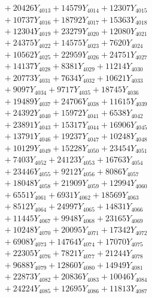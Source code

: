 \documentclass[a4paper,10pt]{article}
\begin{document}
{\begin{align}
&\;  + 20426 Y_{4013} + 14579 Y_{4014} + 12307 Y_{4015} \\[0.3ex]
&\;  + 10737 Y_{4016} + 18792 Y_{4017} + 15363 Y_{4018} \\[0.5ex]\allowbreak
&\;  + 12304 Y_{4019} + 23279 Y_{4020} + 12080 Y_{4021} \\[0.3ex]
&\;  + 24375 Y_{4022} + 14575 Y_{4023} + 7620 Y_{4024} \\[0.3ex]
&\;  + 10562 Y_{4025} + 22959 Y_{4026} + 24751 Y_{4027} \\[0.3ex]
&\;  + 14137 Y_{4028} + 8381 Y_{4029} + 11214 Y_{4030} \\[0.3ex]
&\;  + 20773 Y_{4031} + 7634 Y_{4032} + 10621 Y_{4033} \\[0.3ex]
&\;  + 9097 Y_{4034} + 9717 Y_{4035} + 18745 Y_{4036} \\[0.3ex]
&\;  + 19489 Y_{4037} + 24706 Y_{4038} + 11615 Y_{4039} \\[0.3ex]
&\;  + 24392 Y_{4040} + 15972 Y_{4041} + 6538 Y_{4042} \\[0.3ex]
&\;  + 23891 Y_{4043} + 15317 Y_{4044} + 16906 Y_{4045} \\[0.3ex]
&\;  + 13791 Y_{4046} + 19237 Y_{4047} + 10248 Y_{4048} \\[0.5ex]\allowbreak
&\;  + 10129 Y_{4049} + 15228 Y_{4050} + 23454 Y_{4051} \\[0.3ex]
&\;  + 7403 Y_{4052} + 24123 Y_{4053} + 16763 Y_{4054} \\[0.3ex]
&\;  + 23446 Y_{4055} + 9212 Y_{4056} + 8086 Y_{4057} \\[0.3ex]
&\;  + 18048 Y_{4058} + 21909 Y_{4059} + 12994 Y_{4060} \\[0.3ex]
&\;  + 6551 Y_{4061} + 6931 Y_{4062} + 18569 Y_{4063} \\[0.3ex]
&\;  + 8512 Y_{4064} + 24997 Y_{4065} + 14831 Y_{4066} \\[0.3ex]
&\;  + 11445 Y_{4067} + 9948 Y_{4068} + 23165 Y_{4069} \\[0.3ex]
&\;  + 10248 Y_{4070} + 20095 Y_{4071} + 17342 Y_{4072} \\[0.3ex]
&\;  + 6908 Y_{4073} + 14764 Y_{4074} + 17070 Y_{4075} \\[0.3ex]
&\;  + 22305 Y_{4076} + 7821 Y_{4077} + 21244 Y_{4078} \\[0.5ex]\allowbreak
&\;  + 9688 Y_{4079} + 12860 Y_{4080} + 14949 Y_{4081} \\[0.3ex]
&\;  + 22873 Y_{4082} + 20836 Y_{4083} + 10046 Y_{4084} \\[0.3ex]
&\;  + 24224 Y_{4085} + 12695 Y_{4086} + 11813 Y_{4087} \\[0.3ex]

\end{align}}
\end{document}
